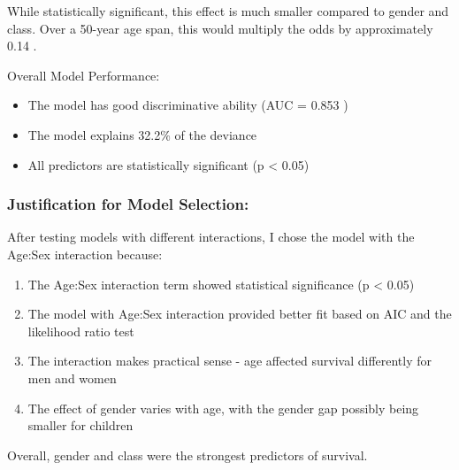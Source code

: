 \documentclass{article}
\begin{document}
While statistically significant, this effect is much smaller compared to gender and class.
   Over a 50-year age span, this would multiply the odds by approximately 0.14 .

Overall Model Performance:
\begin{itemize}
    \item The model has good discriminative ability (AUC = 0.853 )
    \item The model explains 32.2\% of the deviance
    \item All predictors are statistically significant (p < 0.05)
\end{itemize}

\subsubsection{Justification for Model Selection:}
After testing models with different interactions, I chose the model with the Age:Sex interaction because:
\begin{enumerate}
    \item The Age:Sex interaction term showed statistical significance (p < 0.05)
    \item The model with Age:Sex interaction provided better fit based on AIC and the likelihood ratio test
    \item The interaction makes practical sense - age affected survival differently for men and women
    \item The effect of gender varies with age, with the gender gap possibly being smaller for children
\end{enumerate}

Overall, gender and class were the strongest predictors of survival.

\begin{figure}[htbp]
    \centering
    
    \label{fig:seven_subfigures}
\end{figure}
\end{document}
